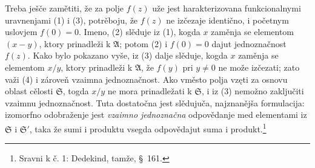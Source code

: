 \documentclass[11pt]{article}
\providecommand{\Afield}{\mathfrak A}
\providecommand{\Sdomain}{\mathfrak S}
\begin{document}
Treba ješče zamětiti, že za polje \(f(z)\) uže jest harakterizovana funkcionalnymi uravnenjami (1) i (3), potrěboju, že \(f(z)\) ne izčezaje identično, i početnym uslovjem \(f(0)=0\). Imeno, (2) slěduje iz (1), kogda \(x\) zaměnja se elementom \((x-y)\), ktory prinadleži k \(\Afield\); potom (2) i \(f(0)=0\) dajut jednoznačnost \(f(z)\). Kako bylo pokazano vyše, iz (3) dalje slěduje, kogda \(x\) zaměnja se elementom \(x/y\), ktory prinadleži k \(\Afield\), že \(f(y)\) pri \(y\ne0\) ne može izčezati; zato važi (4) i zároveň vzaimna jednoznačnost. Ako vměsto polja vzęti za osnovu oblast cělosti \(\Sdomain\), togda \(x/y\) ne mora prinadležati k \(\Sdomain\), i iz (3) nemožno zaključiti vzaimnu jednoznačnost. Tuta dostatočna jest slědujuča, najznanějša formulacija: izomorfno odobraženje jest {\itshape vzaimno jednoznačna} odpovědanje med elementami iz \(\Sdomain\) i \(\Sdomain'\), taka že sumi i produktu vsegda odpovědajut suma i produkt.\footnote{Sravni k č. 1: Dedekind, tamže, \S\ 161.}

\clearpage
\end{document}
